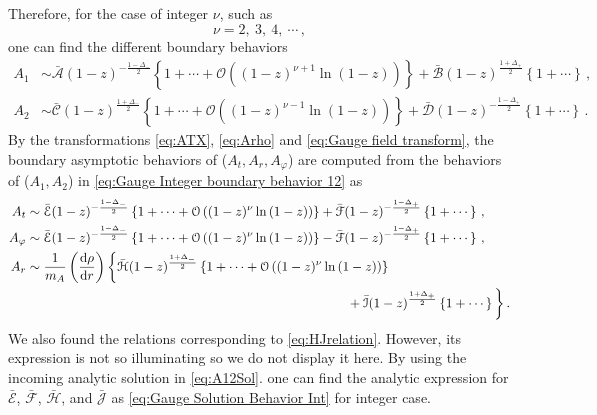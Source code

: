 \documentclass[11pt,a4paper]{article}
\newcommand{\dd}{\mathrm{d}}
\begin{document}
Therefore, for the case of integer $\nu$, such as
\begin{equation} \label{eq:Int nu range vector}
    \nu=2,~3,~4,~\cdots\,,
\end{equation}
one can find the different boundary behaviors
\begin{equation}\label{eq:Gauge Integer boundary behavior 12}
\begin{aligned}
    A_1 &\sim \bar{\mathcal{A}} (1-z)^{-\frac{1-\Delta_{-}}{2}} \left\{1 + \cdots +\mathcal{O}\left( (1-z)^{\nu+1} \ln{(1-z)}\right)  \right\} + \bar{\mathcal{B}} (1-z)^{\frac{1+\Delta_{+}}{2}} \left\{1+\cdots\right\} \,,
    \\
    A_2 &\sim \bar{\mathcal{C}} (1-z)^{\frac{1+\Delta_{-}}{2}} \left\{1 +\cdots+ \mathcal{O}\left( (1-z)^{\nu-1} \ln{(1-z)}\right) \right\} + \bar{\mathcal{D}} (1-z)^{-\frac{1-\Delta_{+}}{2}} \left\{1+\cdots\right\} \,.
\end{aligned}
\end{equation}
By the transformations \eqref{eq:ATX}, \eqref{eq:Arho} and \eqref{eq:Gauge field transform}, the boundary asymptotic behaviors of ($A_t, A_r, A_\varphi$) are computed from the behaviors of ($A_1,A_2$) in \eqref{eq:Gauge Integer boundary behavior 12} as
\begin{equation} \label{eq:Gauge Integer boundary behavior}
\begin{aligned}
    A_t & \sim \bar{\mathcal{E}}(1-z)^{-\frac{1-\Delta_-}{2}} \left\{1 + \cdots +\mathcal{O}\left( (1-z)^{\nu} \ln{(1-z)}\right)  \right\} + \bar{\mathcal{F}}(1-z)^{-\frac{1-\Delta_+}{2}} \left\{1 + \cdots \right\}\,,\\
    A_\varphi & \sim \bar{\mathcal{E}}(1-z)^{-\frac{1-\Delta_-}{2}} \left\{1 + \cdots +\mathcal{O}\left( (1-z)^{\nu} \ln{(1-z)}\right)  \right\} - \bar{\mathcal{F}}(1-z)^{-\frac{1-\Delta_+}{2}} \left\{1 + \cdots \right\}\,,\\
    A_r & \sim \frac{1}{m_A} \left(\frac{\dd \rho}{\dd r}\right) \bigg\{ \bar{\mathcal{H}}(1-z)^{\frac{1+\Delta_-}{2}} \left\{1 + \cdots +\mathcal{O}\left( (1-z)^{\nu} \ln{(1-z)}\right)  \right\}\\
    & \hspace{8.65cm} + \bar{\mathcal{I}}(1-z)^{\frac{1+\Delta_+}{2}} \left\{1 + \cdots \right\} \bigg\}\,.
\end{aligned}
\end{equation}
We also found the relations corresponding to \eqref{eq:HJrelation}. However, its expression is not so illuminating so we do not display it here.
By using the incoming analytic solution in \eqref{eq:A12Sol}. one can find the analytic expression for $\bar{\mathcal{E}}$, $\bar{\mathcal{F}}$, $\bar{\mathcal{H}}$, and $\bar{\mathcal{J}}$ as \eqref{eq:Gauge Solution Behavior Int} for integer case.
\end{document}
